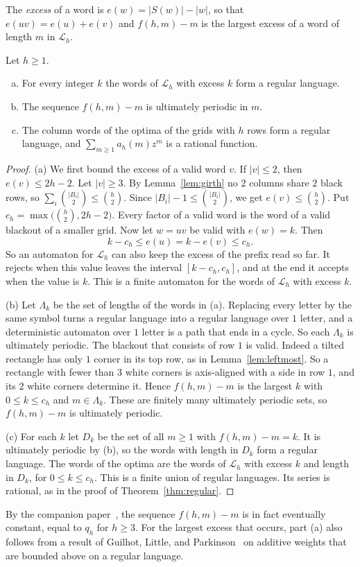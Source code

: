 The \emph{excess} of a word is $e(w)=|S(w)|-|w|$, so that $e(uv)=e(u)+e(v)$ and
$f(h,m)-m$ is the largest excess of a word of length $m$ in $\mathcal L_h$.

\begin{theorem}\label{thm:rational}
Let $h\ge1$.
\begin{enumerate}[(a)]
\item For every integer $k$ the words of $\mathcal L_h$ with excess $k$ form a
regular language.
\item The sequence $f(h,m)-m$ is ultimately periodic in $m$.
\item The column words of the optima of the grids with $h$ rows form a regular
language, and $\sum_{m\ge1}a_h(m)z^m$ is a rational function.
\end{enumerate}
\end{theorem}

\begin{proof}
(a) We first bound the excess of a valid word $v$. If $|v|\le2$, then
$e(v)\le2h-2$. Let $|v|\ge3$. By Lemma~\ref{lem:girth} no $2$ columns share $2$
black rows, so $\sum_i\binom{|B_i|}2\le\binom h2$. Since
$|B_i|-1\le\binom{|B_i|}2$, we get $e(v)\le\binom h2$. Put
$c_h=\max\bigl(\binom h2,2h-2\bigr)$. Every factor of a valid word is the word
of a valid blackout of a smaller grid. Now let $w=uv$ be valid with $e(w)=k$.
Then
\[
k-c_h\le e(u)=k-e(v)\le c_h .
\]
So an automaton for $\mathcal L_h$ can also keep the excess of the prefix read
so far. It rejects when this value leaves the interval $[k-c_h,c_h]$, and at
the end it accepts when the value is $k$. This is a finite automaton for the
words of $\mathcal L_h$ with excess $k$.

(b) Let $\Lambda_k$ be the set of lengths of the words in (a). Replacing every
letter by the same symbol turns a regular language into a regular language
over $1$ letter, and a deterministic automaton over $1$ letter is a path that
ends in a cycle. So each $\Lambda_k$ is ultimately periodic. The blackout that
consists of row $1$ is valid. Indeed a tilted rectangle has only $1$ corner in
its top row, as in Lemma~\ref{lem:leftmost}. So a rectangle with fewer than $3$
white corners is axis-aligned with a side in row $1$, and its $2$ white corners
determine it. Hence $f(h,m)-m$ is the largest $k$ with $0\le k\le c_h$ and
$m\in\Lambda_k$. These are finitely many ultimately periodic sets, so
$f(h,m)-m$ is ultimately periodic.

(c) For each $k$ let $D_k$ be the set of all $m\ge1$ with $f(h,m)-m=k$. It is
ultimately periodic by (b), so the words with length in $D_k$ form a regular
language. The words of the optima are the words of $\mathcal L_h$ with excess
$k$ and length in $D_k$, for $0\le k\le c_h$. This is a finite union of regular
languages. Its series is rational, as in the proof of
Theorem~\ref{thm:regular}.
\end{proof}

By the companion paper~\cite{pemmasaniExtremal}, the sequence $f(h,m)-m$ is in
fact eventually constant, equal to $q_h$ for $h\ge3$. For the largest excess
that occurs, part (a) also follows from a result of Guilhot, Little, and
Parkinson~\cite[Theorem~1(3)]{glp2025} on additive weights that are bounded
above on a regular language.
